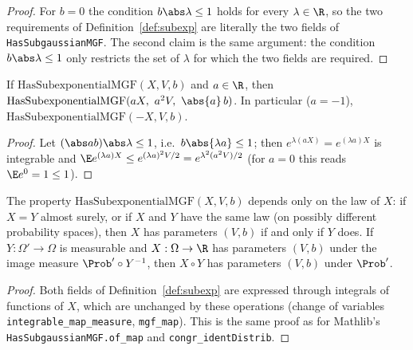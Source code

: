 \begin{proof}
\leanok
{}
For $b = 0$ the condition $b\abs\lambda\le1$ holds for every $\lambda\in\R$, so the two
requirements of Definition~\ref{def:subexp} are literally the two fields of
\texttt{HasSubgaussianMGF}. The second claim is the same argument: the condition
$b\abs\lambda \le 1$ only restricts the set of $\lambda$ for which the two fields are required.
\end{proof}

\begin{lemma}[Scaling]\label{lem:subexp_const_mul}
\leanok
{}
If $\mathrm{HasSubexponentialMGF}(X,V,b)$ and $a \in \R$, then
$\mathrm{HasSubexponentialMGF}(aX,\ a^2V,\ \abs{a}\,b)$. In particular ($a = -1$),
$\mathrm{HasSubexponentialMGF}(-X, V, b)$.
\end{lemma}

\begin{proof}
\leanok
{}
Let $(\abs ab)\abs\lambda \le 1$, i.e.\ $b\abs{\lambda a} \le 1$; then $e^{\lambda(aX)} = e^{(\lambda a)X}$
is integrable and $\E e^{(\lambda a)X} \le e^{(\lambda a)^2V/2} = e^{\lambda^2(a^2V)/2}$
(for $a = 0$ this reads $\E e^{0} = 1 \le 1$).
\end{proof}

\begin{lemma}[Transport]\label{lem:ps_subexp_map}
\leanok
{}
The property $\mathrm{HasSubexponentialMGF}(X,V,b)$ depends only on the law of $X$: if
$X = Y$ almost surely, or if $X$ and $Y$ have the same law (on possibly different probability
spaces), then $X$ has parameters $(V,b)$ if and only if $Y$ does. If $Y : \Omega' \to \Omega$ is
measurable and $X : \Omega \to \R$ has parameters $(V,b)$ under the image measure
$\Prob' \circ Y^{-1}$, then $X \circ Y$ has parameters $(V,b)$ under $\Prob'$.
\end{lemma}

\begin{proof}
\leanok
{}
Both fields of Definition~\ref{def:subexp} are expressed through integrals of functions of
$X$, which are unchanged by these operations (change of variables
\texttt{integrable\_map\_measure}, \texttt{mgf\_map}). This is the same proof as for Mathlib's
\texttt{HasSubgaussianMGF.of\_map} and \texttt{congr\_identDistrib}.
\end{proof}


